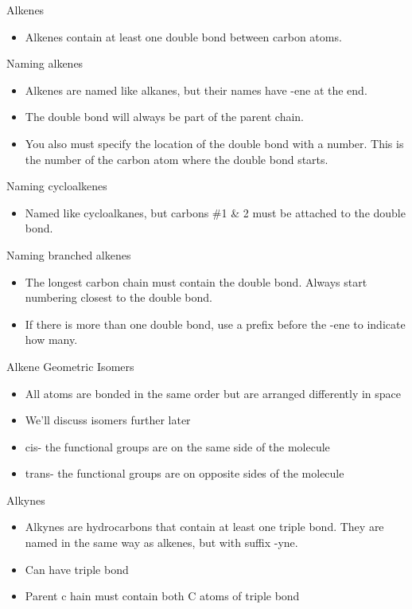 \documentclass[../hchem.tex]{subfiles}
\begin{document}
Alkenes 
\begin{itemize}
    \item Alkenes contain at least one double bond between carbon atoms.
\end{itemize}

Naming alkenes 
\begin{itemize}
    \item Alkenes are named like alkanes, but their names have -ene at the end.
    \item The double bond will always be part of the parent chain.
    \item You also must specify the location of the double bond with a number. This is the number of the carbon atom where the double bond starts.
\end{itemize}

Naming cycloalkenes 
\begin{itemize}
    \item Named like cycloalkanes, but carbons \#1 \& 2 must be attached to the double bond.
\end{itemize}

Naming branched alkenes 
\begin{itemize}
    \item The longest carbon chain must contain the double bond. Always start numbering closest to the double bond.
    \item If there is more than one double bond, use a prefix before the -ene to indicate how many.
\end{itemize}

Alkene Geometric Isomers 
\begin{itemize}
    \item All atoms are bonded in the same order but are arranged differently in space 
    \item We'll discuss isomers further later 
    \item cis- the functional groups are on the same side of the molecule 
    \item trans- the functional groups are on opposite sides of the molecule 
\end{itemize}

Alkynes 
\begin{itemize}
    \item Alkynes are hydrocarbons that contain at least one triple bond. They are named in the same way as alkenes, but with suffix -yne.
    \item Can have  triple bond 
    \item Parent c hain must contain both C atoms of triple bond 
\end{itemize}
\end{document}
